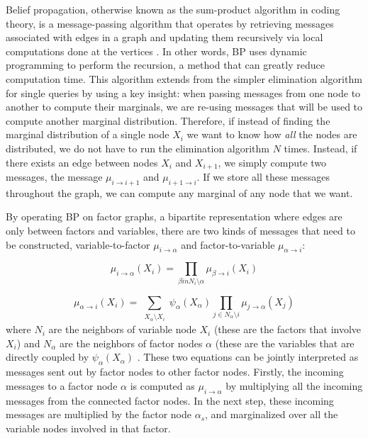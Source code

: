 \documentclass{article}
\begin{document}
Belief propagation, otherwise known as the sum-product algorithm in coding theory, is a message-passing algorithm that operates by retrieving messages associated with edges in a graph and updating them recursively via local computations done at the vertices \cite{bp_book}. In other words, BP uses dynamic programming to perform the recursion, a method that can greatly reduce computation time. This algorithm extends from the simpler elimination algorithm for single queries by using a key insight: when passing messages from one node to another to compute their marginals, we are re-using messages that will be used to compute another marginal distribution. Therefore, if instead of finding the marginal distribution of a single node $X_i$ we want to know how \textit{all} the nodes are distributed, we do not have to run the elimination algorithm $N$ times. Instead, if there exists an edge between nodes $X_i$ and $X_{i+1}$, we simply compute two messages, the message $ \mu_{i \to i+1}$ and $ \mu_{i+1 \to i}$. If we store all these messages throughout the graph, we can compute any marginal of any node that we want. 

By operating BP on factor graphs, a bipartite representation where edges are only between factors and variables, there are two kinds of messages that need to be constructed, variable-to-factor $\mu_{i \to \alpha}$ and factor-to-variable $\mu_{\alpha \to i}$:

\begin{equation}
\mu_{i \to \alpha}(X_i) = \prod_{\beta in N_{i} \setminus \alpha} \mu_{\beta \to i}(X_i)
\end{equation}

\begin{equation}
\mu_{\alpha \to i}(X_i) = \sum_{\substack{X_{\alpha} \setminus X_i}} \psi_{\alpha}(X_{\alpha}) \prod_{j \in N_\alpha \setminus i} \mu_{j \to \alpha}(X_j)
\end{equation}
where $N_i$ are the neighbors of variable node $X_i$ (these are the factors that involve $X_i$) and $N_\alpha$ are the neighbors of factor nodes $\alpha$ (these are the variables that are directly coupled by $\psi_{\alpha}(X_{\alpha})$ \cite{inf_pgm_gnn}. These two equations can be jointly interpreted as messages sent out by factor nodes to other factor nodes. Firstly, the incoming messages to a factor node $\alpha$ is computed as $\mu_{i \to \alpha}$ by multiplying all the incoming messages from the connected factor nodes. In the next step, these incoming messages are multiplied by the factor node $\alpha_s$, and marginalized over all the variable nodes involved in that factor.  
\end{document}
